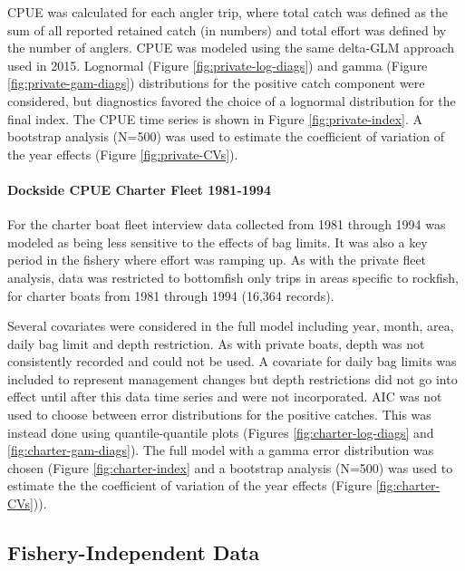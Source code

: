 \documentclass[11pt,
  letterpaper,
]{article}
\begin{document}
CPUE was calculated for each angler trip, where total catch was defined as the sum of all reported retained catch (in numbers) and total effort was defined by the number of anglers. CPUE was modeled using the same delta-GLM approach used in 2015. Lognormal (Figure \ref{fig:private-log-diags}) and gamma (Figure \ref{fig:private-gam-diags}) distributions for the positive catch component were considered, but diagnostics favored the choice of a lognormal distribution for the final index. The CPUE time series is shown in Figure \ref{fig:private-index}. A bootstrap analysis (N=500) was used to estimate the coefficient of variation of the year effects (Figure \ref{fig:private-CVs}).

\hypertarget{dockside-cpue-charter-fleet-1981-1994}{%
\paragraph{Dockside CPUE Charter Fleet 1981-1994}\label{dockside-cpue-charter-fleet-1981-1994}}

For the charter boat fleet interview data collected from 1981 through 1994 was modeled as being less sensitive to the effects of bag limits. It was also a key period in the fishery where effort was ramping up. As with the private fleet analysis, data was restricted to bottomfish only trips in areas specific to rockfish, for charter boats from 1981 through 1994 (16,364 records).

Several covariates were considered in the full model including year, month, area, daily bag limit and depth restriction. As with private boats, depth was not consistently recorded and could not be used. A covariate for daily bag limits was included to represent management changes but depth restrictions did not go into effect until after this data time series and were not incorporated. AIC was not used to choose between error distributions for the positive catches. This was instead done using quantile-quantile plots (Figures \ref{fig:charter-log-diags} and \ref{fig:charter-gam-diags}). The full model with a gamma error distribution was chosen (Figure \ref{fig:charter-index} and a bootstrap analysis (N=500) was used to estimate the the coefficient of variation of the year effects (Figure \ref{fig:charter-CVs})).

\hypertarget{fishery-independent-data}{%
\subsection{Fishery-Independent Data}\label{fishery-independent-data}}
\end{document}

